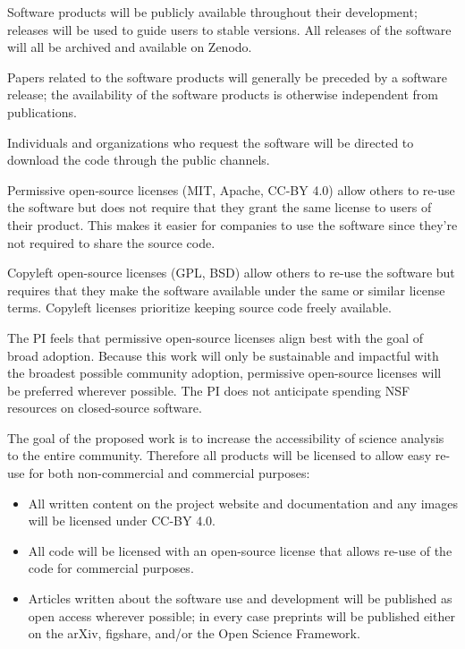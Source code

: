 \documentclass[11pt,oneside]{memoir}
\begin{document}
Software products will be publicly available throughout their development; releases will be used to guide users to stable versions.  All releases of the software will all be archived and available on Zenodo.

Papers related to the software products will generally be preceded by a software release; the availability of the software products is otherwise independent from publications.

Individuals and organizations who request the software will be directed to download the code through the public channels.


Permissive open-source licenses (MIT, Apache, CC-BY 4.0) allow others to re-use the software but does not require that they grant the same license to users of their product.  This makes it easier for companies to use the software since they're not required to share the source code.

Copyleft open-source licenses (GPL, BSD) allow others to re-use the software but requires that they make the software available under the same or similar license terms.  Copyleft licenses prioritize keeping source code freely available.

The PI feels that permissive open-source licenses align best with the goal of broad adoption.  Because this work will only be sustainable and impactful with the broadest possible community adoption, permissive open-source licenses will be preferred wherever possible.  The PI does not anticipate spending NSF resources on closed-source software.

The goal of the proposed work is to increase the accessibility of science analysis to the entire community.  Therefore all products will be licensed to allow easy re-use for both non-commercial and commercial purposes:

\begin{itemize}
  \item All written content on the project website and documentation and any images will be licensed under CC-BY 4.0. 
  \item All code will be licensed with an open-source license that allows re-use of the code for commercial purposes.  
  \item Articles written about the software use and development will be published as open access wherever possible; in every case preprints will be published either on the arXiv, figshare, and/or the Open Science Framework.
\end{itemize}
\end{document}
